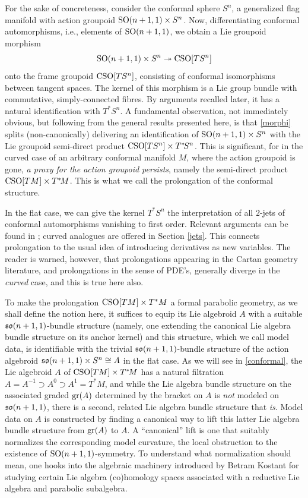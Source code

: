 \documentclass[leqno,12pt]{amsart} %
\begin{document}
For the sake of concreteness, consider the conformal sphere $S^n$, a generalized flag
manifold with action groupoid $\operatorname{\operatorname{SO}}(n + 1, 1) \times S^n$. Now, differentiating conformal
automorphisms, i.e., elements of $\operatorname{\operatorname{SO}}(n + 1, 1)$, we obtain a Lie groupoid morphism
\begin{equation}\label{morphi}
  \operatorname{\operatorname{SO}}(n + 1, 1) \times S^n \twoheadrightarrow \operatorname{\operatorname{CSO}}[TS^n]
\end{equation}
onto the frame groupoid $\operatorname{\operatorname{CSO}}[TS^n]$, consisting of conformal isomorphisms between tangent
spaces. The kernel of this morphism is a Lie group bundle with commutative,
simply-connected fibres. By arguments recalled later, it has a natural identification with
$T^*\!S^n$. A fundamental observation, not immediately obvious, but following from the
general results presented here, is that \eqref{morphi} splits (non-canonically) delivering
an identification of $\operatorname{\operatorname{SO}}(n + 1, 1) \times S^n$ with the Lie groupoid semi-direct product
$\operatorname{\operatorname{CSO}}[TS^n] \times T^*\!S^n$. This is significant, for in the curved case of an arbitrary
conformal manifold $M$, where the action groupoid is gone, {\em a proxy for the action
  groupoid persists}, namely the semi-direct product $\operatorname{\operatorname{CSO}}[TM] \times T^*\!M$. This is what
we call the {\df prolongation} of the conformal structure.

In the flat case, we can give the kernel $T^*\!S^n$ the interpretation of all $2$-jets of
conformal automorphisms vanishing to first order. Relevant arguments can be found in
\cite{Abadoglu_etal_08}; curved analogues are offered in Section \ref{jets}. This connects
prolongation to the usual idea of introducing derivatives as new variables. The reader is
warned, however, that prolongations appearing in the Cartan geometry literature, and
prolongations in the sense of PDE's, generally diverge in the {\em curved} case, and this
is true here also.

To make the prolongation $\operatorname{\operatorname{CSO}}[TM] \times T^*M$ a formal parabolic geometry, as we shall
define the notion here, it suffices to equip its Lie algebroid $A$ with a suitable
$\mathfrak{so}(n + 1, 1)$-bundle structure (namely, one extending the canonical Lie algebra bundle
structure on its anchor kernel) and this structure, which we call {\df model data}, is
identifiable with the trivial $\mathfrak{so}(n + 1, 1)$-bundle structure of the action algebroid
$\mathfrak{so}(n + 1, 1) \times S^n\cong A$ in the flat case. As we will see in \ref{conformal}, the
Lie algebroid $A$ of $\operatorname{\operatorname{CSO}}[TM] \times T^*\!M $ has a natural filtration
$A = A^{-1} \supset A^0 \supset A^1=T^*\!M$, and while the Lie algebra bundle structure on
the associated graded $\operatorname{\operatorname{gr}}(A)$ determined by the bracket on $A$ is {\em not} modeled
on $\mathfrak{so}(n + 1, 1)$, there is a second, related Lie algebra bundle structure that {\em
  is}. Model data on $A$ is constructed by finding a canonical way to lift this latter Lie
algebra bundle structure from $\operatorname{\operatorname{gr}}(A)$ to $A$. A ``canonical'' lift is one that
suitably normalizes the corresponding {\df model curvature}, the local obstruction to the
existence of $\operatorname{\operatorname{SO}}(n + 1, 1)$-symmetry. To understand what normalization should mean, one
hooks into the algebraic machinery introduced by Betram Kostant for studying certain Lie
algebra (co)homology spaces associated with a reductive Lie algebra and parabolic
subalgebra.
\end{document}

